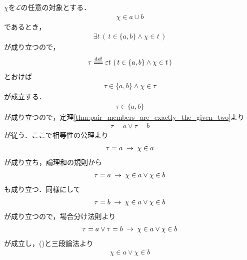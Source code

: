 	
	\begin{sketch}
		$\chi$を$\mathcal{L}$の任意の対象とする．
		\begin{align}
			\chi \in a \cup b
		\end{align}
		であるとき，
		\begin{align}
			\exists t\, \left(\, t \in \{a,b\} \wedge \chi \in t\, \right)
		\end{align}
		が成り立つので，
		\begin{align}
			\tau \defeq \varepsilon t\, \left(\, t \in \{a,b\} \wedge \chi \in t\, \right)
		\end{align}
		とおけば
		\begin{align}
			\tau \in \{a,b\} \wedge \chi \in \tau
		\end{align}
		が成立する．
		\begin{align}
			\tau \in \{a,b\}
		\end{align}
		が成り立つので，定理\ref{thm:pair_members_are_exactly_the_given_two}より
		\begin{align}
			\tau = a \vee \tau = b
			\label{fom:thm_union_of_pair_is_union_of_their_elements_1}
		\end{align}
		が従う．ここで相等性の公理より
		\begin{align}
			\tau = a \hspace{0.25em}\rightarrow\hspace{0.25em} \chi \in a
		\end{align}
		が成り立ち，論理和の規則から
		\begin{align}
			\tau = a \hspace{0.25em}\rightarrow\hspace{0.25em} \chi \in a \vee \chi \in b
		\end{align}
		も成り立つ．同様にして
		\begin{align}
			\tau = b \hspace{0.25em}\rightarrow\hspace{0.25em} \chi \in a \vee \chi \in b
		\end{align}
		が成り立つので，場合分け法則より
		\begin{align}
			\tau = a \vee \tau = b \hspace{0.25em}\rightarrow\hspace{0.25em} \chi \in a \vee \chi \in b
		\end{align}
		が成立し，()と三段論法より
		\begin{align}
			\chi \in a \vee \chi \in b
		\end{align}

\end{sketch}
